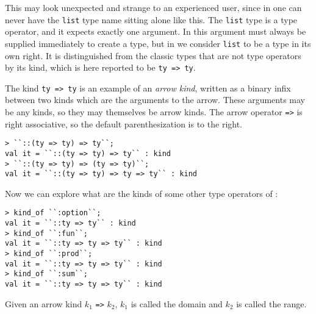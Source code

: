 This may look unexpected and strange to an experienced \HOL{} user, 
since in \HOL{} one
can never have the \texttt{list} type name sitting alone like this.  The
\texttt{list} type is a type operator, and it expects exactly one argument.
In \HOL{} this argument must always be supplied immediately to create a type,
but in \HOLW{} we consider \texttt{list} to be a type in its own right. It is
distinguished from the classic \HOL{} types that are not type operators by
its kind, which is here reported to be \texttt{ty => ty}.

The kind \texttt{ty => ty} is an example of an {\it arrow kind}, written 
as a binary infix between two kinds which are the arguments to the arrow.
These arguments may be any kinds, so they may themselves be arrow kinds.
The arrow operator \texttt{=>} is right associative, so the default
parenthesization is to the right.
%
\begin{session}
\begin{verbatim}
> ``::(ty => ty) => ty``;
val it = ``::(ty => ty) => ty`` : kind
> ``::(ty => ty) => (ty => ty)``;
val it = ``::(ty => ty) => ty => ty`` : kind
\end{verbatim}
\end{session}

Now we can explore what are the kinds of some other type operators of \HOL{}:
%
\begin{session}
\begin{verbatim}
> kind_of ``:option``;
val it = ``::ty => ty`` : kind
> kind_of ``:fun``; 
val it = ``::ty => ty => ty`` : kind
> kind_of ``:prod``;
val it = ``::ty => ty => ty`` : kind
> kind_of ``:sum``;
val it = ``::ty => ty => ty`` : kind
\end{verbatim}
\end{session}

Given an arrow kind $k_1$ \texttt{=>} $k_2$, $k_1$ is called the domain
and $k_2$ is called the range.

